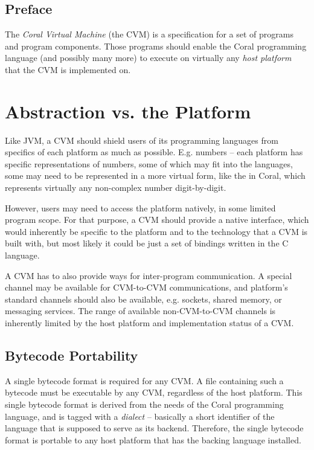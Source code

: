 
\section*{Preface}

The {\em Coral Virtual Machine} (the CVM) is a specification for a set of programs and program components. Those programs should enable the Coral programming language (and possibly many more) to execute on virtually any {\em host platform} that the CVM is implemented on. 





\chapter{Abstraction vs. the Platform}

Like JVM, a CVM should shield users of its programming languages from specifics of each platform as much as possible. E.g. numbers -- each platform has specific representations of numbers, some of which may fit into the languages, some may need to be represented in a more virtual form, like the  in Coral, which represents virtually any non-complex number digit-by-digit. 

However, users may need to access the platform natively, in some limited program scope. For that purpose, a CVM should provide a native interface, which would inherently be specific to the platform and to the technology that a CVM is built with, but most likely it could be just a set of bindings written in the C language. 

A CVM has to also provide ways for inter-program communication. A special channel may be available for CVM-to-CVM communications, and platform's standard channels should also be available, e.g. sockets, shared memory, or messaging services. The range of available non-CVM-to-CVM channels is inherently limited by the host platform and implementation status of a CVM. 





\section{Bytecode Portability}

A single bytecode format is required for any CVM. A file containing such a bytecode must be executable by any CVM, regardless of the host platform. This single bytecode format is derived from the needs of the Coral programming language, and is tagged with a {\em dialect} -- basically a short identifier of the language that is supposed to serve as its backend. Therefore, the single bytecode format is portable to any host platform that has the backing language installed. 

